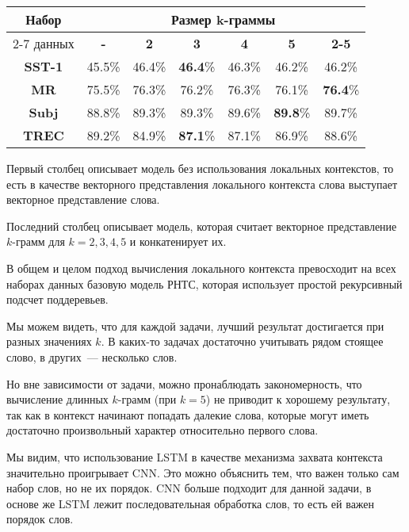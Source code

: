 \begin{minipage}{\linewidth}
 \label{tab:title} 
\begin{tabular}{|c|c|c|c|c|c|c|}
\hline
\multirow{2}{*}{Набор}   &         \multicolumn{6}{c|}{Размер k-граммы} \\ \cline{2-7} 
     данных              & \textbf{-} & \textbf{2} & \textbf{3} & \textbf{4} & \textbf{5} & \textbf{2-5} \\ \hline
\textbf{SST-1}           &  45.5\%    & 46.4\%     &\textbf{46.4}\%& 46.3\%     &  46.2\%    & 46.2\%           \\  \hline
\textbf{MR}              &  75.5\%    & 76.3\%     & 76.2\%     & 76.3\%     & 76.1\%     & \textbf{76.4}\% \\ \hline
\textbf{Subj}            &  88.8\%    & 89.3\%     & 89.3\%     & 89.6\%     &\textbf{89.8}\%    & 89.7\% \\ \hline
\textbf{TREC}            &  89.2\%    & 84.9\%     & \textbf{87.1}\%     & 87.1\%     &  86.9\%    & 88.6\%  \\ \hline
\end{tabular}
\vspace{5mm}
\end{minipage}
\vspace{5mm}

Первый столбец описывает модель без использования локальных контекстов, то есть в качестве векторного представления локального контекста слова выступает векторное представление слова.

Последний столбец описывает модель, которая считает векторное представление $k$-грамм для $k=2,3,4,5$ и конкатенирует их.

В общем и целом подход вычисления локального контекста превосходит на всех наборах данных базовую модель РНТС\cite{socher-EtAl:2013:EMNLP}, которая использует простой рекурсивный подсчет поддеревьев.

Мы можем видеть, что для каждой задачи, лучший результат достигается при разных значениях $k$. В каких-то задачах достаточно учитывать рядом стоящее слово, в других~--- несколько слов.

Но вне зависимости от задачи, можно пронаблюдать закономерность, что 
вычисление длинных $k$-грамм (при $k=5$) не приводит к хорошему результату, 
так как в контекст начинают попадать далекие слова, 
которые могут иметь достаточно произвольный характер относительно первого слова.

Мы видим, что использование LSTM в качестве механизма захвата контекста значительно проигрывает CNN.
Это можно объяснить тем, что важен только сам набор слов, но не их порядок. 
CNN больше подходит для данной задачи, в основе же LSTM лежит последовательная обработка слов, то есть ей важен порядок слов.

